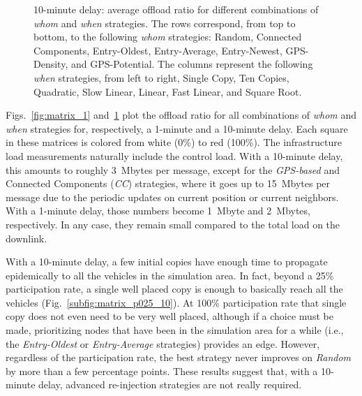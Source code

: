 \documentclass[preprint]{elsarticle}
\begin{document}
\begin{figure}[t]
  \centering
  \caption{10-minute delay: average offload ratio for different combinations of \textit{whom} and \textit{when} strategies. The rows correspond, from top to bottom, to the following \textit{whom} strategies: Random, Connected Components, Entry-Oldest, Entry-Average, Entry-Newest, GPS-Density, and GPS-Potential. The columns represent the following \textit{when} strategies, from left to right, Single Copy, Ten Copies, Quadratic, Slow Linear, Linear, Fast Linear, and Square Root.}
  \label{fig:matrix_10}
\end{figure}

Figs.~\ref{fig:matrix_1} and~\ref{fig:matrix_10} plot the offload ratio for all combinations of \textit{whom} and \textit{when} strategies for, respectively, a 1-minute and a 10-minute delay. Each square in these matrices is colored from white (0\%) to red (100\%). The infrastructure load measurements naturally include the control load. With a 10-minute delay, this amounts to roughly 3~Mbytes per message, except for the \textit{GPS-based} and Connected Components (\textit{CC}) strategies, where it goes up to 15~Mbytes per message due to the periodic updates on current position or current neighbors. With a 1-minute delay, those numbers become 1~Mbyte and 2~Mbytes, respectively. In any case, they remain small compared to the total load on the downlink.

With a 10-minute delay, a few initial copies have enough time to propagate epidemically to all the vehicles in the simulation area. In fact, beyond a 25\% participation rate, a single well placed copy is enough to basically reach all the vehicles (Fig.~\ref{subfig:matrix_p025_10}). At 100\% participation rate that single copy does not even need to be very well placed, although if a choice must be made, prioritizing nodes that have been in the simulation area for a while (i.e., the \textit{Entry-Oldest} or \textit{Entry-Average} strategies) provides an edge. However, regardless of the participation rate, the best strategy never improves on \textit{Random} by more than a few percentage points. These results suggest that, with a 10-minute delay, advanced re-injection strategies are not really required.
\end{document}
